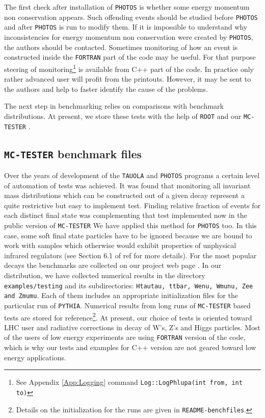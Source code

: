 \documentclass[]{Photos_interface_design}
\begin{document}
The first check after installation of {\tt PHOTOS} is whether some energy momentum non 
conservation appears. Such offending events should be studied
before {\tt PHOTOS}  and after {\tt PHOTOS} is run to modify them.
If it is impossible to understand why inconsistencies for energy momentum non 
conservation were created by {\tt PHOTOS}, the authors should be contacted. Sometimes
monitoring of how an event is constructed inside the {\tt FORTRAN} part of the code
may be useful. For that purpose  steering of monitoring\footnote{See Appendix \ref{App:Logging}
command {\tt Log::LogPhlupa(int from, int to)}}
 is
available from C++ part of the code. In practice only rather
 advanced user will profit from the printouts. However, it may be sent to
the authors and help to faster identify the cause of the problems.


The next step in benchmarking relies on comparisons with benchmark distributions. 
At present, we store these tests with the help of {\tt ROOT} \cite{Antcheva:2009zz} and our {\tt MC-TESTER} \cite{Davidson:2008ma}.



\subsection{{\tt MC-TESTER} benchmark files}



Over the years of development of the {\tt TAUOLA} and {\tt PHOTOS} programs a certain level 
of automation of tests was achieved. It was found that monitoring all invariant mass distributions which can be constructed out of a given decay represent 
a quite restrictive but easy to implement test.
Finding  relative fraction of events for each distinct final state 
 was complementing that test implemented now in the public version of {\tt MC-TESTER} 
We have applied this method 
for {\tt PHOTOS} too. In this case, some soft final state particles have to be ignored because we are bound to  work with  samples which otherwise would
exhibit properties of unphysical infrared regulators (see Section 6.1 of 
ref \cite{Davidson:2008ma} for more details). For the most popular 
decays the benchmarks are collected on our project web page \cite{Photos_tests}.
In our distribution, we have collected numerical results in the directory
{\tt examples/testing} and its subdirectories:  
{\tt Htautau, ttbar, Wenu, Wmunu, Zee and Zmumu}. Each of them includes
an appropriate initialization files for the particular run of {\tt PYTHIA}. Numerical results from long runs of {\tt MC-TESTER} based tests
are stored for reference\footnote{Details on the initialization for the 
runs are given in 
{\tt README-benchfiles}.}. At present, our choice of tests is oriented toward 
LHC user and radiative corrections in decay of W's, Z's and Higgs particles.
Most of the users of low energy experiments are using {\tt FORTRAN} version 
of the code, which is why our tests and examples for C++ version are not geared toward 
low energy applications.
\end{document}
